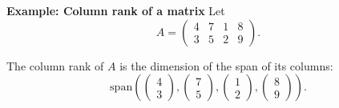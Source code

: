 \noindent\textbf{Example: Column rank of a matrix}
Let
\[
A = \begin{pmatrix} 4 & 7 & 1 & 8 \\ 3 & 5 & 2 & 9 \end{pmatrix}.
\]

The column rank of $A$ is the dimension of the span of its columns:
\[
\text{span}\left(
\begin{pmatrix} 4 \\ 3 \end{pmatrix},
\begin{pmatrix} 7 \\ 5 \end{pmatrix},
\begin{pmatrix} 1 \\ 2 \end{pmatrix},
\begin{pmatrix} 8 \\ 9 \end{pmatrix}
\right).
\]